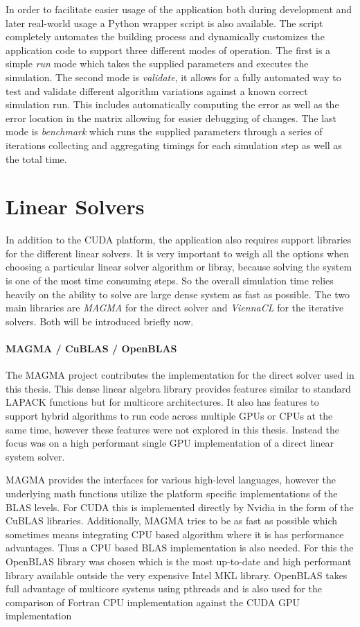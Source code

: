 \documentclass[a4paper,11pt]{kth-mag}
\begin{document}
In order to facilitate easier usage of the application both during development and later real-world usage a Python wrapper script is also available. The script completely automates the building process and dynamically customizes the application code to support three different modes of operation. The first is a simple \emph{run} mode which takes the supplied parameters and executes the simulation. The second mode is \emph{validate}, it allows for a fully automated way to test and validate different algorithm variations against a known correct simulation run. This includes automatically computing the error as well as the error location in the matrix allowing for easier debugging of changes. The last mode is \emph{benchmark} which runs the supplied parameters through a series of iterations collecting and aggregating timings for each simulation step as well as the total time.

\section{Linear Solvers}
In addition to the CUDA platform, the application also requires support libraries for the different linear solvers. It is very important to weigh all the options when choosing a particular linear solver algorithm or libray, because solving the system is one of the most time consuming steps. So the overall simulation time relies heavily on the ability to solve are large dense system as fast as possible. The two main libraries are \emph{MAGMA} for the direct solver and \emph{ViennaCL} for the iterative solvers. Both will be introduced briefly now.

\paragraph{MAGMA / CuBLAS / OpenBLAS}
The MAGMA project contributes the implementation for the direct solver used in this thesis. This dense linear algebra library provides features similar to standard LAPACK functions but for multicore architectures. It also has features to support hybrid algorithms to run code across multiple GPUs or CPUs at the same time, however these features were not explored in this thesis. Instead the focus was on a high performant single GPU implementation of a direct linear system solver.

MAGMA provides the interfaces for various high-level languages, however the underlying math functions utilize the platform specific implementations of the BLAS levels. For CUDA this is implemented directly by Nvidia in the form of the CuBLAS libraries. Additionally, MAGMA tries to be as fast as possible which sometimes means integrating CPU based algorithm where it is has performance advantages. Thus a CPU based BLAS implementation is also needed. For this the OpenBLAS library was chosen which is the most up-to-date and high performant library available outside the very expensive Intel MKL library. OpenBLAS takes full advantage of multicore systems using pthreads and is also used for the comparison of Fortran CPU implementation against the CUDA GPU implementation
\end{document}
